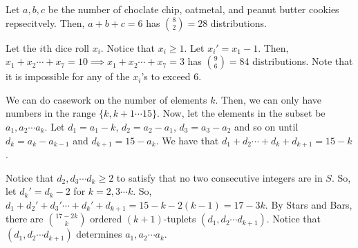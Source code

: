 \documentclass[11pt]{article}
\begin{document}
\begin{sol} 
Let $a,b,c$ be the number of choclate chip, oatmetal, and peanut butter cookies repsecitvely. Then, $a+b+c=6$ has $\binom{8}{2}=\boxed{28}$ distributions.
\end{sol}


\begin{sol} 
Let the $i$th dice roll $x_{i}$. Notice that $x_{i}\ge 1$. Let $x_{i}'=x_{1}-1$. Then, $x_{1}+x_{2}\cdots + x_{7}=10\implies x_{1}+x_{2}\cdots + x_{7}=3$ has $\binom{9}{6}=\boxed{84}$ distributions. Note that it is impossible for any of the $x_{i}$'s to exceed $6$.
\end{sol}


\begin{sol} 
We can do casework on the number of elements $k$. Then, we can only have numbers in the range $\{k,k+1\cdots 15\}$. Now, let the elements in the subset be $a_{1},a_{2}\cdots a_{k}$. Let $d_{1}=a_{1}-k$, $d_{2}=a_{2}-a_{1}$, $d_{3}=a_{3}-a_{2}$ and so on until $d_{k}=a_{k}-a_{k-1}$ and $d_{k+1}=15-a_{k}$. We have that $d_{1}+d_{2}\cdots + d_{k}+d_{k+1}=15-k$. 

Notice that $d_{2},d_{3}\cdots d_{k}\ge 2$ to satisfy that no two consecutive integers are in $S$. So, let $d_{k}'=d_{k}-2$ for $k=2,3\cdots k$. So, $d_{1}+d_{2}'+d_{3}'\cdots +d_{k}'+d_{k+1}=15-k-2(k-1)=17-3k$. By Stars and Bars, there are $\binom{17-2k}{k}$ ordered $(k+1)$-tuplets $(d_{1},d_{2}\cdots d_{k+1})$. Notice that $(d_{1},d_{2}\cdots d_{k+1})$ determines $a_{1},a_{2}\cdots a_{k}$.
\end{sol}

\end{document}
